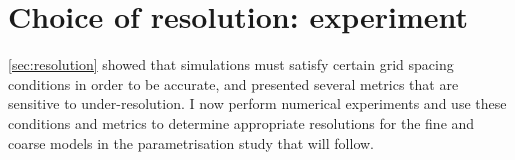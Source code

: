 \documentclass[../main.tex]{subfiles}
\begin{document}
\section{Choice of resolution: experiment}
\cref{sec:resolution} showed that simulations must satisfy certain grid spacing
conditions in order to be accurate, and presented several metrics that are
sensitive to under-resolution. I now perform numerical experiments and
use these conditions and metrics to determine appropriate resolutions for
the fine and coarse models in the parametrisation study that will follow.



\ifSubfilesClassLoaded{%
    \emergencystretch=5em
    \printbibliography{}
}{}
\end{document}
